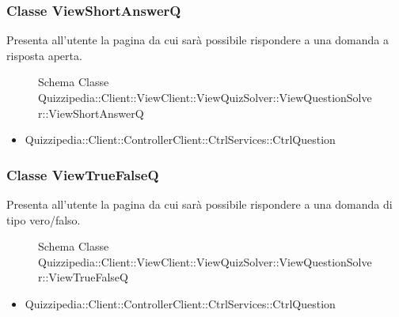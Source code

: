 \subsubsection{Classe ViewShortAnswerQ}
Presenta all'utente la pagina da cui sarà possibile rispondere a una domanda a risposta aperta.
\begin{figure}[H]
\centering
\noindent{}
\caption[Schema Classe ViewShortAnswerQ]{Schema Classe Quizzipedia::Client::ViewClient::ViewQuizSolver::ViewQuestionSolver::ViewShortAnswerQ}
\end{figure}
\begin{itemize}
\item Quizzipedia::Client::ControllerClient::CtrlServices::CtrlQuestion
\end{itemize}
\subsubsection{Classe ViewTrueFalseQ}
Presenta all'utente la pagina da cui sarà possibile rispondere a una domanda di tipo vero/falso.
\begin{figure}[H]
\centering
\noindent{}
\caption[Schema Classe ViewTrueFalseQ]{Schema Classe Quizzipedia::Client::ViewClient::ViewQuizSolver::ViewQuestionSolver::ViewTrueFalseQ}
\end{figure}
\begin{itemize}
\item Quizzipedia::Client::ControllerClient::CtrlServices::CtrlQuestion
\end{itemize}
